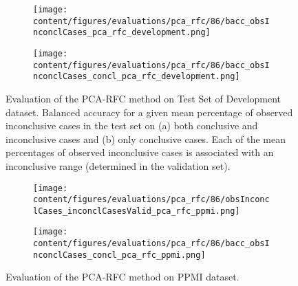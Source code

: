 \begin{figure}[t]
  \begin{subfigure}{0.9\textwidth}
    \centering
    \texttt{[image: content/figures/evaluations/pca\_rfc/86/bacc\_obsInconclCases\_pca\_rfc\_development.png]}
    \subcaption{}
    \label{fig:bacc_obsInconclCases_pca_rfc_development}
  \end{subfigure}
  \hfill
  \begin{subfigure}{0.9\textwidth}
    \centering
    \texttt{[image: content/figures/evaluations/pca\_rfc/86/bacc\_obsInconclCases\_concl\_pca\_rfc\_development.png]}
    \subcaption{}
    \label{fig:bacc_obsInconclCases_concl_pca_rfc_development}
  \end{subfigure}

  \caption{Evaluation of the PCA-RFC method on Test Set of Development dataset.
  Balanced accuracy for a given mean percentage of observed inconclusive cases in the test set on 
  (a) both conclusive and inconclusive cases and (b) only conclusive cases. 
  Each of the mean percentages of observed inconclusive cases is associated with an inconclusive range (determined in the validation set). }
  \label{fig:bacc_obsInconclCases_pca_rfc_development_full}
\end{figure}




\begin{figure}[t]
  \begin{subfigure}{0.9\textwidth}
    \centering
    \texttt{[image: content/figures/evaluations/pca\_rfc/86/obsInconclCases\_inconclCasesValid\_pca\_rfc\_ppmi.png]}
    \label{fig:obsInconclCases_inconclCasesValid_pca_rfc_ppmi}
  \end{subfigure}
  \hfill
  \begin{subfigure}{0.9\textwidth}
    \centering
    \texttt{[image: content/figures/evaluations/pca\_rfc/86/bacc\_obsInconclCases\_concl\_pca\_rfc\_ppmi.png]}
    \label{fig:bacc_obsInconclCases_concl_pca_rfc_ppmi}
  \end{subfigure}
  \caption{Evaluation of the PCA-RFC method on PPMI dataset.}
\end{figure}



